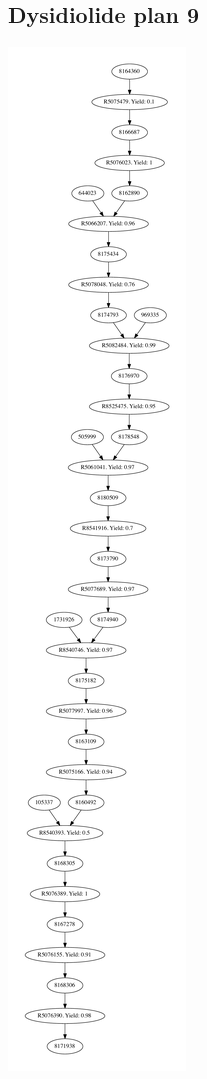 \documentclass[a4paper,10pt,titlepage]{paper}
\begin{document}
\subsection{Dysidiolide plan 9}
\centering
\includegraphics[scale=0.25]{Synteseplaner/Dysidiolide/plan9.pdf}
\label{Appendix::Dysidiolide9}
\end{document}
